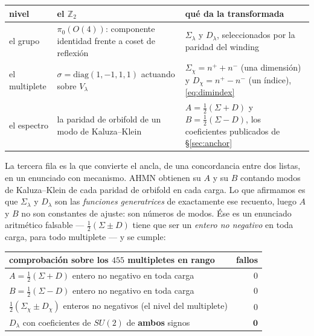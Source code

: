 \documentclass[11pt,a4paper]{article}
\newcommand{\ZZ}{\mathbb{Z}}
\newcommand{\Sig}{\Sigma_\lambda}
\newcommand{\Dl}{D_\lambda}
\begin{document}
\begin{center}\small
{}
\begin{tabular}{p{3.2cm} p{5.3cm} p{6.3cm}}
\toprule
\rowcolor{hdrblue!14}\textbf{nivel} & \textbf{el $\ZZ_2$} & \textbf{qué da la transformada}\\
\midrule
el grupo & $\pi_0(O(4))$: componente identidad frente a coset de reflexión & $\Sig$ y $\Dl$,
seleccionados por la paridad del winding\\
el multiplete & $\sigma=\mathrm{diag}(1,-1,1,1)$ actuando sobre $V_\lambda$ & $\Sigma_\chi=n^++n^-$
(una dimensión) y $D_\chi=n^+-n^-$ (un índice), \eqref{eq:dimindex}\\
el espectro & la paridad de orbifold de un modo de Kaluza--Klein & $A=\tfrac12(\Sigma+D)$ y
$B=\tfrac12(\Sigma-D)$, los coeficientes publicados de \S\ref{sec:anchor}\\
\bottomrule
\end{tabular}
\end{center}

\noindent La tercera fila es la que convierte el ancla, de una concordancia entre dos listas, en un
enunciado con mecanismo. AHMN obtienen su $A$ y su $B$ contando modos de Kaluza--Klein de cada
paridad de orbifold en cada carga. Lo que afirmamos es que $\Sig$ y $\Dl$ son las \emph{funciones
generatrices} de exactamente ese recuento, luego $A$ y $B$ no son constantes de ajuste: son números
de modos. Ése es un enunciado aritmético falsable --- $\tfrac12(\Sigma\pm D)$ tiene que ser un
\emph{entero no negativo} en toda carga, para todo multiplete --- y se cumple:

\begin{center}\small
{}
\begin{tabular}{lr}
\toprule
\rowcolor{hdrblue!14}\textbf{comprobación sobre los $455$ multipletes en rango} & \textbf{fallos}\\
\midrule
$A=\tfrac12(\Sigma+D)$ entero no negativo en toda carga & $0$\\
$B=\tfrac12(\Sigma-D)$ entero no negativo en toda carga & $0$\\
$\tfrac12(\Sigma_\chi\pm D_\chi)$ enteros no negativos (el nivel del multiplete) & $0$\\
\rowcolor{okgreen!14}$\Dl$ con coeficientes de $SU(2)$ de \textbf{ambos} signos & $\mathbf{0}$\\
\bottomrule
\end{tabular}
\end{center}
\end{document}
